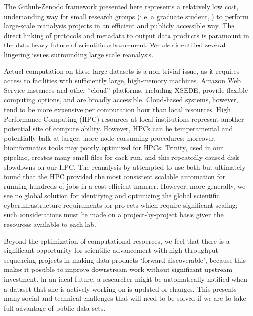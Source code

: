 \documentclass[a4paper,num-refs]{oup-contemporary}
\begin{document}
The Github-Zenodo framework presented here represents a relatively low
cost, undemanding way for small research groups (i.e. a graduate
student, ) to perform large-scale reanalysis projects in an efficient
and publicly accessible way. The direct linking of protocols and
metadata to output data products is paramount in the data heavy future
of scientific advancement. We also identified several lingering issues surrounding large scale
reanalysis.

Actual computation on these large datasets is a non-trivial issue, as
it requires access to facilities with sufficiently large, high-memory
machines.  Amazon Web Service instances and other ``cloud'' platforms,
including XSEDE, provide flexible computing options, and are broadly
accessible. Cloud-based systems, however, tend to be more expensive
per computation hour than local resources. High Performance Computing
(HPC) resources at local institutions represent another potential site
of compute ability.  However, HPCs can be temperamental and
potentially balk at larger, more node-consuming procedures; moreover,
bioinformatics tools may poorly optimized for HPCs: Trinity, used in
our pipeline, creates many small files for each run, and this
repeatedly caused disk slowdowns on our HPC.  The reanalysis by
\citet{Johnson2018} attempted to use both but ultimately
found that the HPC provided the most consistent scalable automation
for running hundreds of jobs in a cost efficient manner.  However,
more generally, we see no global solution for identifying and
optimizing the global scientific cyberinfrastructure requirements for
projects which require significant scaling; such considerations must
be made on a project-by-project basis given the resources available to
each lab.

Beyond the optimization of computational resources, we feel that there
is a significant opportunity for scientific advancement with
high-throughput sequencing projects in making data products `forward
discoverable', because this makes it possible to improve downstream
work without significant upstream investment.  In an ideal future, a
researcher might be automatically notified when a dataset that she is
actively working on is updated or changes. This presents many social
and technical challenges that will need to be solved if we are to take
full advantage of public data sets.
\end{document}
